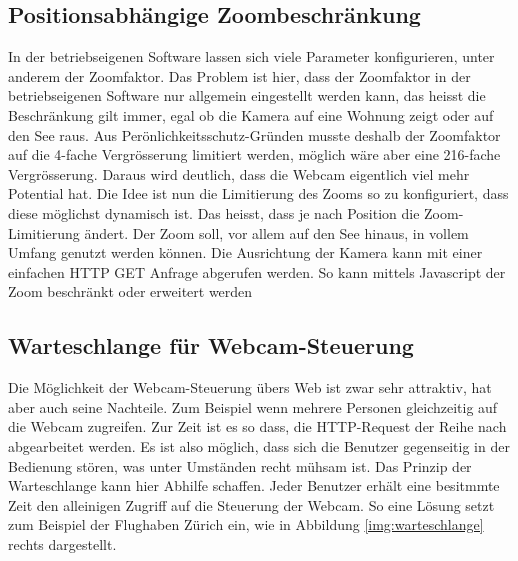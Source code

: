 \subsection{Positionsabhängige Zoombeschränkung}
In der betriebseigenen Software lassen sich viele Parameter konfigurieren, unter anderem der Zoomfaktor. Das Problem ist hier, dass der Zoomfaktor in der betriebseigenen Software nur allgemein eingestellt werden kann, das heisst die Beschränkung gilt immer, egal ob die Kamera auf eine Wohnung zeigt oder auf den See raus. Aus Perönlichkeitsschutz-Gründen musste deshalb der Zoomfaktor auf die 4-fache Vergrösserung limitiert werden, möglich wäre aber eine 216-fache Vergrösserung. Daraus wird deutlich, dass die Webcam eigentlich viel mehr Potential hat. Die Idee ist nun die Limitierung des Zooms so zu konfiguriert, dass diese möglichst dynamisch ist. Das heisst, dass je nach Position die Zoom-Limitierung ändert. Der Zoom soll, vor allem auf den See hinaus, in vollem Umfang genutzt werden können. Die Ausrichtung der Kamera kann mit einer einfachen HTTP GET Anfrage abgerufen werden. So kann mittels Javascript der Zoom beschränkt oder erweitert werden

\subsection{Warteschlange für Webcam-Steuerung}
Die Möglichkeit der Webcam-Steuerung übers Web ist zwar sehr attraktiv, hat aber auch seine Nachteile. Zum Beispiel wenn mehrere Personen gleichzeitig auf die Webcam zugreifen. Zur Zeit ist es so dass, die HTTP-Request der Reihe nach abgearbeitet werden. Es ist also möglich, dass sich die Benutzer gegenseitig in der Bedienung stören, was unter Umständen recht mühsam ist. Das Prinzip der Warteschlange kann hier Abhilfe schaffen. Jeder Benutzer erhält eine besitmmte Zeit den alleinigen Zugriff auf die Steuerung der Webcam. So eine Lösung setzt zum Beispiel der Flughaben Zürich ein, wie in Abbildung \ref{img:warteschlange} rechts dargestellt.



